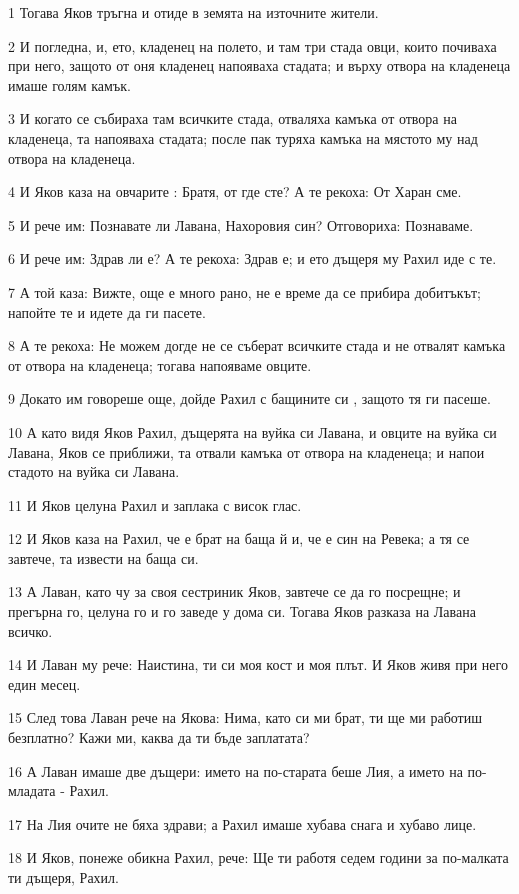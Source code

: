 \par 1 Тогава Яков тръгна и отиде в земята на източните жители.
\par 2 И погледна, и, ето, кладенец на полето, и там три стада овци, които почиваха при него, защото от оня кладенец напояваха стадата; и върху отвора на кладенеца имаше голям камък.
\par 3 И когато се събираха там всичките стада, отваляха камъка от отвора на кладенеца, та напояваха стадата; после пак туряха камъка на мястото му над отвора на кладенеца.
\par 4 И Яков каза на овчарите : Братя, от где сте? А те рекоха: От Харан сме.
\par 5 И рече им: Познавате ли Лавана, Нахоровия син? Отговориха: Познаваме.
\par 6 И рече им: Здрав ли е? А те рекоха: Здрав е; и ето дъщеря му Рахил иде с те.
\par 7 А той каза: Вижте, още е много рано, не е време да се прибира добитъкът; напойте те и идете да ги пасете.
\par 8 А те рекоха: Не можем догде не се съберат всичките стада и не отвалят камъка от отвора на кладенеца; тогава напояваме овците.
\par 9 Докато им говореше още, дойде Рахил с бащините си , защото тя ги пасеше.
\par 10 А като видя Яков Рахил, дъщерята на вуйка си Лавана, и овците на вуйка си Лавана, Яков се приближи, та отвали камъка от отвора на кладенеца; и напои стадото на вуйка си Лавана.
\par 11 И Яков целуна Рахил и заплака с висок глас.
\par 12 И Яков каза на Рахил, че е брат на баща й и, че е син на Ревека; а тя се завтече, та извести на баща си.
\par 13 А Лаван, като чу за своя сестриник Яков, завтече се да го посрещне; и прегърна го, целуна го и го заведе у дома си. Тогава Яков разказа на Лавана всичко.
\par 14 И Лаван му рече: Наистина, ти си моя кост и моя плът. И Яков живя при него един месец.
\par 15 След това Лаван рече на Якова: Нима, като си ми брат, ти ще ми работиш безплатно? Кажи ми, каква да ти бъде заплатата?
\par 16 А Лаван имаше две дъщери: името на по-старата беше Лия, а името на по-младата - Рахил.
\par 17 На Лия очите не бяха здрави; а Рахил имаше хубава снага и хубаво лице.
\par 18 И Яков, понеже обикна Рахил, рече: Ще ти работя седем години за по-малката ти дъщеря, Рахил.
